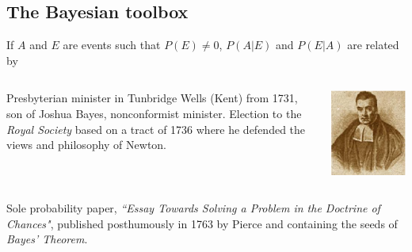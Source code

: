 \subsection{The Bayesian toolbox}\begin{slide}

\centerline{}

\bigskip
\pause
If $A$ and $E$ are events such that $P(E)\ne 0$, $P(A|E)$ and $P(E|A)$ are related by
{}

\end{slide}
\begin{slide}

\begin{block}{}
\begin{columns}
Presbyterian minister in Tunbridge Wells (Kent) from 1731, son of Joshua Bayes, nonconformist minister.
Election to the {\em Royal Society} based on a tract of 1736 where he defended the views
and philosophy of Newton.

\includegraphics[height=4truecm]{figures/TBayes}
\end{columns}

\medskip
\pause
Sole probability paper, {\em ``Essay Towards Solving a Problem in the Doctrine of Chances"},
published posthumously in 1763 by Pierce
and containing the seeds of {\em Bayes' Theorem}.%
\end{block}

\end{slide}
